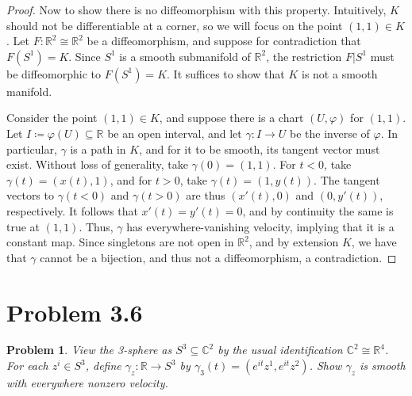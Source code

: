 \documentclass[11pt, letterpaper]{article}
\theoremstyle{plain}
\newtheorem{problem}{Problem}
\begin{document}
\begin{proof}
	Now to show there is no diffeomorphism with this property. Intuitively, $K$ should not be differentiable at a corner, so we will focus on the point $(1,1)\in K$. Let $F : \mathbb{R} ^2 \cong \mathbb{R} ^2$ be a diffeomorphism, and suppose for contradiction that $F(S^1) = K$. Since $S^1$ is a smooth submanifold of $\mathbb{R} ^2$, the restriction $F|S^1$ must be diffeomorphic to $F(S^1)=K$. It suffices to show that $K$ is not a smooth manifold.

	Consider the point $(1,1)\in K$, and suppose there is a chart $(U,\varphi )$ for $(1,1)$. Let $I\coloneqq \varphi (U) \subseteq \mathbb{R} $ be an open interval, and let $\gamma : I \to U$ be the inverse of $\varphi $. In particular, $\gamma $ is a path in $K$, and for it to be smooth, its tangent vector must exist. Without loss of generality, take $\gamma (0)=(1,1)$. For $t<0$, take $\gamma (t)=(x(t),1)$, and for $t>0$, take $\gamma (t)=(1,y(t))$. The tangent vectors to $\gamma (t<0)$ and $\gamma (t>0)$ are thus $(x'(t),0)$ and $(0,y'(t))$, respectively. It follows that $x'(t)=y'(t)=0$, and by continuity the same is true at $(1,1)$. Thus, $\gamma $ has everywhere-vanishing velocity, implying that it is a constant map. Since singletons are not open in $\mathbb{R} ^2$, and by extension $K$, we have that $\gamma $ cannot be a bijection, and thus not a diffeomorphism, a contradiction.
\end{proof}

\section{Problem 3.6}

\begin{problem}
	View the 3-sphere as $S^3 \subseteq \mathbb{C} ^2$ by the usual identification $\mathbb{C} ^2 \cong \mathbb{R} ^4$. For each $z^i\in S^3$, define $\gamma _z : \mathbb{R}  \to S^3$ by $\gamma _3(t)=(e^{it} z^1,e^{it} z^2)$. Show $\gamma _z$ is smooth with everywhere nonzero velocity.
\end{problem}
\end{document}
